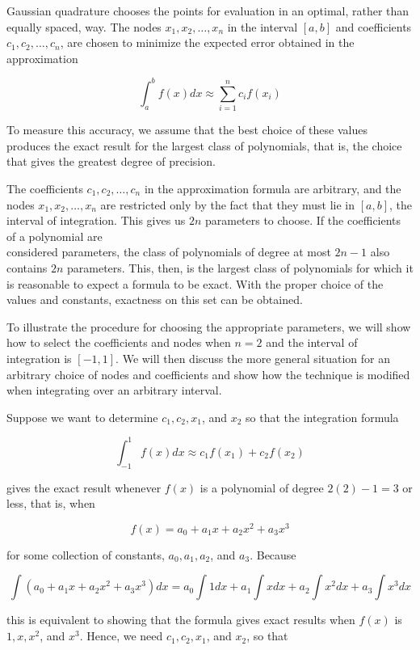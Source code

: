 \documentclass[12pt,a4paper]{article}
\begin{document}
Gaussian quadrature chooses the points for evaluation in an optimal, rather than equally spaced, way. The nodes $x_{1}, x_{2}, \ldots, x_{n}$ in the interval $[a, b]$ and coefficients $c_{1}, c_{2}, \ldots, c_{n}$, are chosen to minimize the expected error obtained in the approximation

$$
\int_{a}^{b} f(x) d x \approx \sum_{i=1}^{n} c_{i} f\left(x_{i}\right)
$$

To measure this accuracy, we assume that the best choice of these values produces the exact result for the largest class of polynomials, that is, the choice that gives the greatest degree of precision.

The coefficients $c_{1}, c_{2}, \ldots, c_{n}$ in the approximation formula are arbitrary, and the nodes $x_{1}, x_{2}, \ldots, x_{n}$ are restricted only by the fact that they must lie in $[a, b]$, the interval of integration. This gives us $2 n$ parameters to choose. If the coefficients of a polynomial are\\
considered parameters, the class of polynomials of degree at most $2 n-1$ also contains $2 n$ parameters. This, then, is the largest class of polynomials for which it is reasonable to expect a formula to be exact. With the proper choice of the values and constants, exactness on this set can be obtained.

To illustrate the procedure for choosing the appropriate parameters, we will show how to select the coefficients and nodes when $n=2$ and the interval of integration is $[-1,1]$. We will then discuss the more general situation for an arbitrary choice of nodes and coefficients and show how the technique is modified when integrating over an arbitrary interval.

Suppose we want to determine $c_{1}, c_{2}, x_{1}$, and $x_{2}$ so that the integration formula

$$
\int_{-1}^{1} f(x) d x \approx c_{1} f\left(x_{1}\right)+c_{2} f\left(x_{2}\right)
$$

gives the exact result whenever $f(x)$ is a polynomial of degree $2(2)-1=3$ or less, that is, when

$$
f(x)=a_{0}+a_{1} x+a_{2} x^{2}+a_{3} x^{3}
$$

for some collection of constants, $a_{0}, a_{1}, a_{2}$, and $a_{3}$. Because

$$
\int\left(a_{0}+a_{1} x+a_{2} x^{2}+a_{3} x^{3}\right) d x=a_{0} \int 1 d x+a_{1} \int x d x+a_{2} \int x^{2} d x+a_{3} \int x^{3} d x
$$

this is equivalent to showing that the formula gives exact results when $f(x)$ is $1, x, x^{2}$, and $x^{3}$. Hence, we need $c_{1}, c_{2}, x_{1}$, and $x_{2}$, so that
\end{document}
